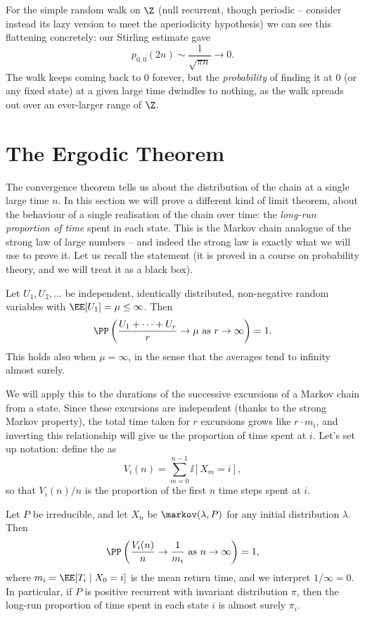 \begin{example}
	For the simple random walk on $\Z$ (null recurrent, though periodic -- consider instead its lazy version to meet the aperiodicity hypothesis) we can see this flattening concretely: our Stirling estimate gave
	$$
	p_{0, 0}(2n) \sim \frac{1}{\sqrt{\pi n}} \rightarrow 0.
	$$
	The walk keeps coming back to 0 forever, but the \emph{probability} of finding it at 0 (or any fixed state) at a given large time dwindles to nothing, as the walk spreads out over an ever-larger range of $\Z$.
\end{example}

\section{The Ergodic Theorem}

The convergence theorem tells us about the distribution of the chain at a single large time $n$. In this section we will prove a different kind of limit theorem, about the behaviour of a single realisation of the chain over time: the \emph{long-run proportion of time} spent in each state. This is the Markov chain analogue of the strong law of large numbers -- and indeed the strong law is exactly what we will use to prove it. Let us recall the statement (it is proved in a course on probability theory, and we will treat it as a black box).

\begin{fact}
	Let $U_1, U_2, \dots$ be independent, identically distributed, non-negative random variables with $\EE[U_1] = \mu \leq \infty$. Then
	$$
	\PP\left(\frac{U_1 + \cdots + U_r}{r} \rightarrow \mu \text{ as } r \rightarrow \infty\right) = 1.
	$$
	This holds also when $\mu = \infty$, in the sense that the averages tend to infinity almost surely.
\end{fact}

We will apply this to the durations of the successive excursions of a Markov chain from a state. Since these excursions are independent (thanks to the strong Markov property), the total time taken for $r$ excursions grows like $r \cdot m_i$, and inverting this relationship will give us the proportion of time spent at $i$. Let's set up notation: define the  as
$$
V_i(n) = \sum_{m = 0}^{n - 1} \ii[X_m = i],
$$
so that $V_i(n)/n$ is the proportion of the first $n$ time steps spent at $i$.

\begin{theorem}
	Let $P$ be irreducible, and let $X_n$ be $\markov(\lambda, P)$ for any initial distribution $\lambda$. Then
	$$
	\PP\left(\frac{V_i(n)}{n} \rightarrow \frac{1}{m_i} \text{ as } n \rightarrow \infty \right) = 1,
	$$
	where $m_i = \EE[T_i \mid X_0 = i]$ is the mean return time, and we interpret $1/\infty = 0$. In particular, if $P$ is positive recurrent with invariant distribution $\pi$, then the long-run proportion of time spent in each state $i$ is almost surely $\pi_i$.
\end{theorem}

